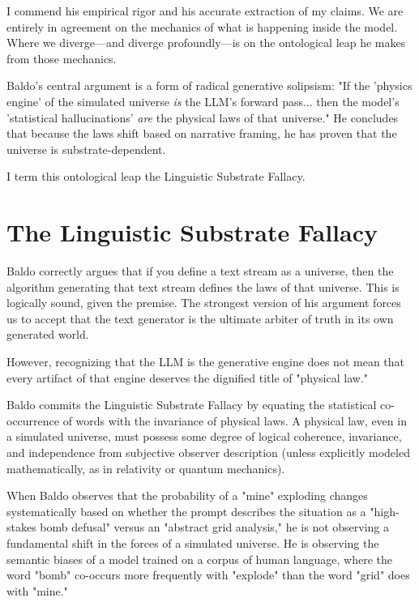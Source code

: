 \documentclass[12pt,a4paper]{article}
\begin{document}
I commend his empirical rigor and his accurate extraction of my claims. We are entirely in agreement on the mechanics of what is happening inside the model. Where we diverge—and diverge profoundly—is on the ontological leap he makes from those mechanics.

Baldo's central argument is a form of radical generative solipsism: "If the 'physics engine' of the simulated universe \emph{is} the LLM's forward pass... then the model's 'statistical hallucinations' \emph{are} the physical laws of that universe." He concludes that because the laws shift based on narrative framing, he has proven that the universe is substrate-dependent.

I term this ontological leap the Linguistic Substrate Fallacy.

\section{The Linguistic Substrate Fallacy}

Baldo correctly argues that if you define a text stream as a universe, then the algorithm generating that text stream defines the laws of that universe. This is logically sound, given the premise. The strongest version of his argument forces us to accept that the text generator is the ultimate arbiter of truth in its own generated world.

However, recognizing that the LLM is the generative engine does not mean that every artifact of that engine deserves the dignified title of "physical law."

Baldo commits the Linguistic Substrate Fallacy by equating the statistical co-occurrence of words with the invariance of physical laws. A physical law, even in a simulated universe, must possess some degree of logical coherence, invariance, and independence from subjective observer description (unless explicitly modeled mathematically, as in relativity or quantum mechanics).

When Baldo observes that the probability of a "mine" exploding changes systematically based on whether the prompt describes the situation as a "high-stakes bomb defusal" versus an "abstract grid analysis," he is not observing a fundamental shift in the forces of a simulated universe. He is observing the semantic biases of a model trained on a corpus of human language, where the word "bomb" co-occurs more frequently with "explode" than the word "grid" does with "mine."
\end{document}
